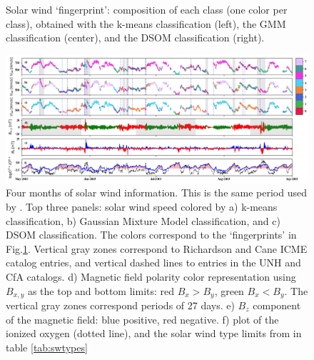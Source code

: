 \documentclass[utf8]{frontiersSCNS} %
\begin{document}
\begin{figure}[h!]
\begin{tabular}{CCC}
	\end{tabular}
	\caption{Solar wind `fingerprint': composition of each class (one color per class), obtained with the k-means classification (left), the GMM classification (center), and the DSOM classification (right).}\label{fig:classesdatarange}
\end{figure}

\begin{figure}[h!]
	\begin{center}
		\includegraphics[width=18cm]{Amaya/timeseries}%
	\end{center}
	\caption{Four months of solar wind information. This is the same period used by \citep{Roberts2020}. Top three panels: solar wind speed colored by a) k-means classification, b) Gaussian Mixture Model classification, and c) DSOM classification. The colors correspond to the `fingerprints' in Fig.\ref{fig:classesdatarange}. Vertical gray zones correspond to Richardson and Cane ICME catalog entries, and vertical dashed lines to entries in the UNH and CfA catalogs. d) Magnetic field polarity color representation using $B_{x,y}$ as the top and bottom limits: red $B_x>B_y$, green $B_x<B_y$. The vertical gray zones correspond periods of 27 days. e) $B_z$ component of the magnetic field: blue positive, red negative. f) plot of the ionized oxygen (dotted line), and the solar wind type limits from \citep{Zhao2009} in table \ref{tab:swtypes}}\label{fig:timeseries}
\end{figure}
\end{document}
